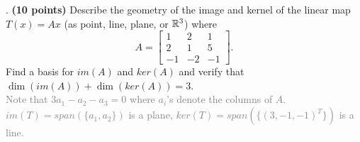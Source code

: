 \documentclass[12pt,a4paper]{article}
\newcommand{\gray}[1]{\textcolor{gray}{#1}}
\renewcommand{\l}{\left}
\renewcommand{\r}{\right}
\let\italiccorrection=\/
\def\/{\ifmmode\expandafter\frac\else\italiccorrection\fi}
\newcommand{\x}{\times}
\def\R{\ifmmode\mathbb R\fi}
\begin{document}
\newpage
{}. \textbf{(10 points)} Describe the geometry of the image and kernel of the linear map $T(x) = Ax$ (as point, line, plane, or $\R^3$) where 
$$A = \l[
\begin{array}{ccc}
    1 & 2 & 1 \\
    2 & 1 & 5 \\
    -1& -2& -1
\end{array}
\r].$$
Find a basis for $im(A)$ and $ker(A)$ and verify that $\dim(im(A)) + \dim(ker(A)) = 3$. \\
\gray{ 
	Note that $3a_1 - a_2 - a_3 = 0$ where $a_i$'s denote the columns of $A$. $im(T) = span(\{a_1, a_2\})$ is a plane, $ker(T) = span(\{(3, -1, -1)^T\})$ is a line.
}




\end{document}
